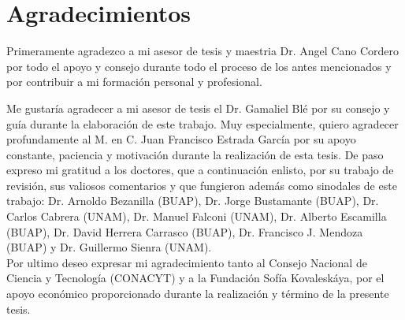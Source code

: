 \chapter*{Agradecimientos}

Primeramente agradezco a mi asesor de tesis y maestria Dr. Angel Cano Cordero por todo el apoyo y consejo durante todo el proceso de los antes mencionados y por contribuir a mi formación personal y profesional.



Me gustar\'ia agradecer a mi asesor de tesis el Dr. Gamaliel Bl\'e por su consejo y gu\'ia durante la elaboraci\'on de este trabajo. Muy especialmente, quiero  agradecer profundamente al M. en C. Juan Francisco Estrada Garc\'ia por su apoyo constante, paciencia  y  motivaci\'on durante  la realizaci\'on de esta tesis. De paso expreso mi gratitud  a los doctores, que a continuaci\'on enlisto, por su trabajo de revisi\'on, sus valiosos comentarios y que fungieron adem\'as  como sinodales de este trabajo: Dr. Arnoldo Bezanilla (BUAP), Dr. Jorge Bustamante (BUAP), Dr. Carlos Cabrera (UNAM), Dr. Manuel Falconi (UNAM),  Dr. Alberto Escamilla (BUAP), Dr. David Herrera Carrasco (BUAP), Dr. Francisco J. Mendoza (BUAP) y  Dr. Guillermo Sienra (UNAM).\\

Por ultimo  deseo expresar mi agradecimiento tanto al Consejo Nacional de Ciencia y Tecnolog\'ia (CONACYT) y a la Fundaci\'on Sof\'ia Kovalesk\'aya, por el apoyo econ\'omico proporcionado durante la realizaci\'on y t\'ermino de la presente tesis.


